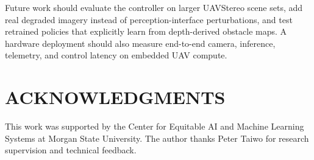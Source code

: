 \documentclass[12pt]{article}
\begin{document}
Future work should evaluate the controller on larger UAVStereo scene sets, add real degraded imagery instead of perception-interface perturbations, and test retrained policies that explicitly learn from depth-derived obstacle maps. A hardware deployment should also measure end-to-end camera, inference, telemetry, and control latency on embedded UAV compute.

\section{\MakeUppercase{Acknowledgments}}

\noindent
This work was supported by the Center for Equitable AI and Machine Learning Systems at Morgan State University. The author thanks Peter Taiwo for research supervision and technical feedback.



\end{document}
